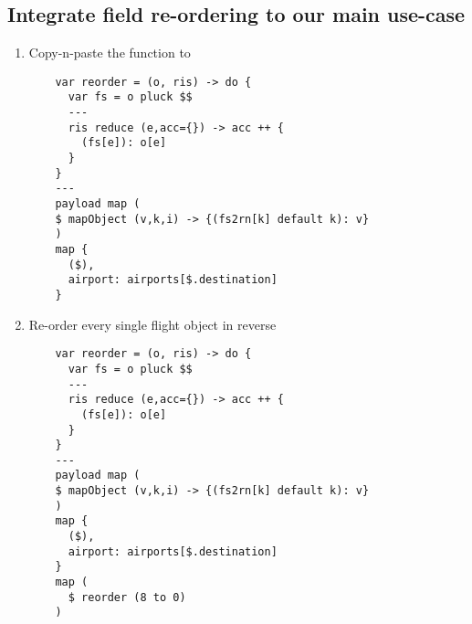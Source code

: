 \subsection{Integrate field re-ordering to our main use-case}
\begin{enumerate}[resume*]
\item Copy-n-paste the  function to 
  \begin{verbatim}
    var reorder = (o, ris) -> do {
      var fs = o pluck $$
      ---
      ris reduce (e,acc={}) -> acc ++ {
        (fs[e]): o[e] 
      }
    }
    ---
    payload map (
    $ mapObject (v,k,i) -> {(fs2rn[k] default k): v}
    )
    map {
      ($),
      airport: airports[$.destination]
    }
  \end{verbatim}
\item Re-order every single flight object in reverse
  \begin{verbatim}
    var reorder = (o, ris) -> do {
      var fs = o pluck $$
      ---
      ris reduce (e,acc={}) -> acc ++ {
        (fs[e]): o[e] 
      }
    }
    ---
    payload map (
    $ mapObject (v,k,i) -> {(fs2rn[k] default k): v}
    )
    map {
      ($),
      airport: airports[$.destination]
    }
    map (
      $ reorder (8 to 0)
    )
  \end{verbatim}
\end{enumerate}
